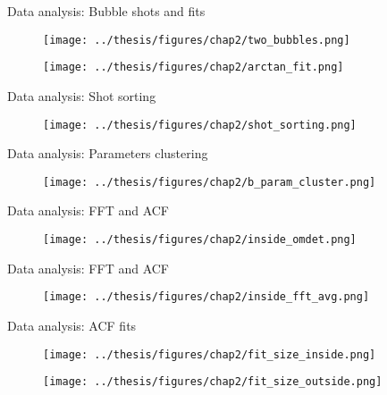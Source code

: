 \documentclass[handout]{beamer}
\begin{document}
\begin{frame}{Data analysis: Bubble shots and fits}
    \vspace{-0.2cm}
    \begin{figure}
        \centering
        \texttt{[image: ../thesis/figures/chap2/two\_bubbles.png]}
    \end{figure}
    \vspace{-0.5cm}
    \begin{figure}
        \centering
        \texttt{[image: ../thesis/figures/chap2/arctan\_fit.png]}
    \end{figure}
\end{frame}

\begin{frame}{Data analysis: Shot sorting}
    \begin{figure}
        \centering
        \texttt{[image: ../thesis/figures/chap2/shot\_sorting.png]}
    \end{figure}
\end{frame}

\begin{frame}{Data analysis: Parameters clustering}
    \vspace{-0.2cm}
    \begin{figure}
        \centering
        \texttt{[image: ../thesis/figures/chap2/b\_param\_cluster.png]}
    \end{figure}
\end{frame}

\begin{frame}{Data analysis: FFT and ACF}
    \vspace{-0.2cm}
    \begin{figure}
        \centering
        \texttt{[image: ../thesis/figures/chap2/inside\_omdet.png]}
    \end{figure}
\end{frame}

\begin{frame}{Data analysis: FFT and ACF}
    \begin{figure}
        \centering
        \texttt{[image: ../thesis/figures/chap2/inside\_fft\_avg.png]}
    \end{figure}
\end{frame}

\begin{frame}{Data analysis: ACF fits}
    \begin{figure}
        \centering
        \texttt{[image: ../thesis/figures/chap2/fit\_size\_inside.png]}
    \end{figure}
    \vspace{-0.5cm}
    \begin{figure}
        \centering
        \texttt{[image: ../thesis/figures/chap2/fit\_size\_outside.png]}
    \end{figure}
\end{frame}
\end{document}
